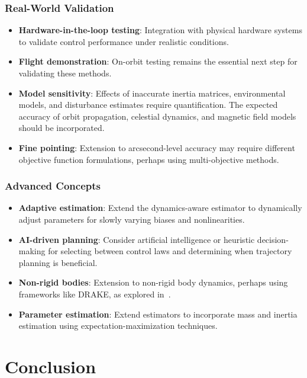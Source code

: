 \documentclass[conference]{IEEEtran}
\begin{document}
\subsubsection{Real-World Validation}\label{subsubsec:validation_future}
\begin{itemize}
    \item \textbf{Hardware-in-the-loop testing}: Integration with physical hardware systems to validate control performance under realistic conditions.
    \item \textbf{Flight demonstration}: On-orbit testing remains the essential next step for validating these methods.
    \item \textbf{Model sensitivity}: Effects of inaccurate inertia matrices, environmental models, and disturbance estimates require quantification. The expected accuracy of orbit propagation, celestial dynamics, and magnetic field models should be incorporated.
    \item \textbf{Fine pointing}: Extension to arcsecond-level accuracy may require different objective function formulations, perhaps using multi-objective methods.
\end{itemize}

\subsubsection{Advanced Concepts}\label{subsubsec:advanced_future}
\begin{itemize}
    \item \textbf{Adaptive estimation}: Extend the dynamics-aware estimator to dynamically adjust parameters for slowly varying biases and nonlinearities.
    \item \textbf{AI-driven planning}: Consider artificial intelligence or heuristic decision-making for selecting between control laws and determining when trajectory planning is beneficial.
    \item \textbf{Non-rigid bodies}: Extension to non-rigid body dynamics, perhaps using frameworks like DRAKE, as explored in~\cite{jackson_planning_2021}.
    \item \textbf{Parameter estimation}: Extend estimators to incorporate mass and inertia estimation using expectation-maximization techniques.
\end{itemize}


\section{Conclusion}\label{sec:conclusion}
\end{document}
